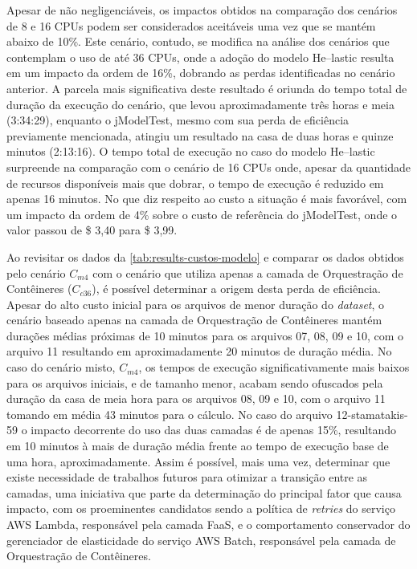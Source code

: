 \documentclass[english,brazilian]{UNISINOSmonografia} %
\begin{document}
Apesar de não negligenciáveis, os impactos obtidos na comparação dos cenários de 8 e 16 CPUs podem ser considerados aceitáveis uma vez que se mantém abaixo de 10\%.
%
Este cenário, contudo, se modifica na análise dos cenários que contemplam o uso de até 36 CPUs, onde a adoção do modelo \textsf{He}--lastic resulta em um impacto da ordem de 16\%, dobrando as perdas identificadas no cenário anterior.
%
A parcela mais significativa deste resultado é oriunda do tempo total de duração da execução do cenário, que levou aproximadamente três horas e meia (3:34:29), enquanto o jModelTest, mesmo com sua perda de eficiência previamente mencionada, atingiu um resultado na casa de duas horas e quinze minutos (2:13:16).
O tempo total de execução no caso do modelo \textsf{He}--lastic surpreende na comparação com o cenário de 16 CPUs onde, apesar da quantidade de recursos disponíveis mais que dobrar, o tempo de execução é reduzido em apenas 16 minutos.
%
No que diz respeito ao custo a situação é mais favorável, com um impacto da ordem de 4\% sobre o custo de referência do jModelTest, onde o valor passou de \$ 3,40 para \$ 3,99.



Ao revisitar os dados da \autoref{tab:results-custos-modelo} e comparar os dados obtidos pelo cenário $C_{m4}$ com o cenário que utiliza apenas a camada de Orquestração de Contêineres ($C_{c36}$), é possível determinar a origem desta perda de eficiência.
%
Apesar do alto custo inicial para os arquivos de menor duração do \textit{dataset}, o cenário baseado apenas na camada de Orquestração de Contêineres mantém durações médias próximas de 10 minutos para os arquivos 07, 08, 09 e 10, com o arquivo 11 resultando em aproximadamente 20 minutos de duração média.
%
No caso do cenário misto, $C_{m4}$, os tempos de execução significativamente mais baixos para os arquivos iniciais, e de tamanho menor, acabam sendo ofuscados pela duração da casa de meia hora para os arquivos 08, 09 e 10, com o arquivo 11 tomando em média 43 minutos para o cálculo.
%
No caso do arquivo 12-stamatakis-59 o impacto decorrente do uso das duas camadas é de apenas 15\%, resultando em 10 minutos à mais de duração média frente ao tempo de execução base de uma hora, aproximadamente.
%
Assim é possível, mais uma vez, determinar que existe necessidade de trabalhos futuros para otimizar a transição entre as camadas, uma iniciativa que parte da determinação do principal fator que causa impacto, com os proeminentes candidatos sendo a política de \textit{retries} do serviço AWS Lambda, responsável pela camada FaaS, e o comportamento conservador do gerenciador de elasticidade do serviço AWS Batch, responsável pela camada de Orquestração de Contêineres.
\end{document}
